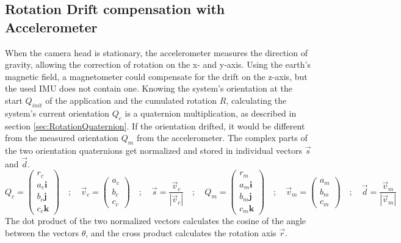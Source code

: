 \subsection{Rotation Drift compensation with Accelerometer}
\label{sec:RotDriftCompensation}
When the camera head is stationary, the accelerometer measures the direction of gravity, allowing the correction of rotation on the x- and y-axis.  Using the earth's magnetic field, a magnetometer could compensate for the drift on the z-axis, but the used IMU does not contain one.
Knowing the system's orientation at the start $Q_{init}$ of the application and the cumulated rotation $R$, calculating the system's current orientation $Q_{c}$ is a quaternion multiplication, as described in section \ref{sec:RotationQuaternion}. If the orientation drifted, it would be different from the measured orientation $Q_{m}$ from the accelerometer. The complex parts of the two orientation quaternions get normalized and stored in individual vectors $\vec{s}$ and $\vec{d}$. 
\begin{equation*}
    Q_{c} =
    \begin{pmatrix}
        r_{c}           \\
        a_{c}\textbf{i} \\
        b_{c}\textbf{j} \\
        c_{c}\textbf{k}
    \end{pmatrix} \quad ; \quad
    \vec{v}_{c} =
    \begin{pmatrix}
        a_{c} \\
        b_{c} \\
        c_{c}
    \end{pmatrix} 
    \quad ; \quad
    \vec{s} = \frac{\vec{v}_{c}}{|\vec{v}_{c}|} 
    \quad ; \quad
    Q_{m} =
    \begin{pmatrix}
        r_{m}           \\
        a_{m}\textbf{i} \\
        b_{m}\textbf{j} \\
        c_{m}\textbf{k}
    \end{pmatrix} \quad ; \quad
    \vec{v}_{m} =
    \begin{pmatrix}
        a_{m} \\
        b_{m} \\
        c_{m}
    \end{pmatrix} 
    \quad ; \quad
    \vec{d} = \frac{\vec{v}_{m}}{|\vec{v}_{m}|}          
\end{equation*}
The dot product of the two normalized vectors calculates the cosine of the angle between the vectors $\theta$, and the cross product calculates the rotation axis $\vec{r}$. 
